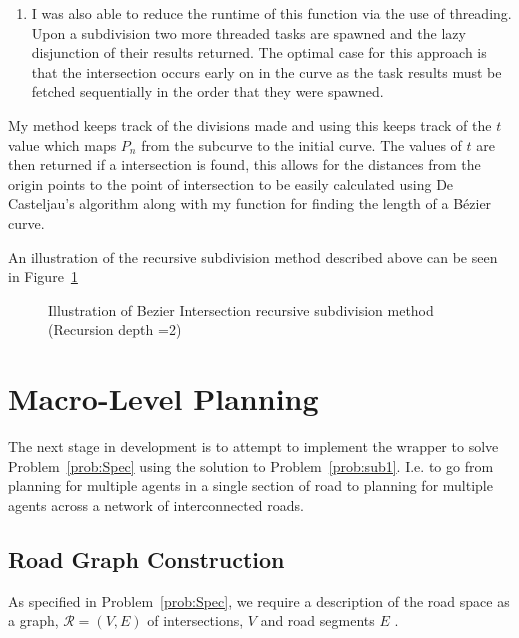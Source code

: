 \begin{enumerate}
  \item I was also able to reduce the runtime of this function via the use of threading. Upon a subdivision two more threaded tasks are spawned and the lazy disjunction of their results returned. The optimal case for this approach is that the intersection occurs early on in the curve as the task results must be fetched sequentially in the order that they were spawned. 

\end{enumerate}

My method keeps track of the divisions made and using this keeps track of the $t$ value which maps $P_{n}$ from the subcurve to the initial curve. The values of $t$ are then returned if a intersection is found, this allows for the distances from the origin points to the point of intersection to be easily calculated using De Casteljau's algorithm along with my function for finding the length of a Bézier curve.

An illustration of the recursive subdivision method described above can be seen in Figure~\ref{fig:bezIntIllustration}

\begin{figure}
\begin{turn}{90}

\end{turn}
\caption{\label{fig:bezIntIllustration} Illustration of Bezier Intersection recursive subdivision method (Recursion depth =2)}
\end{figure}

\section{Macro-Level Planning} 

The next stage in development is to attempt to implement the wrapper to solve Problem~\ref{prob:Spec} using the solution to Problem~\ref{prob:sub1}. I.e. to go from planning for multiple agents in a single section of road to planning for multiple agents across a network of interconnected roads.

\subsection{Road Graph Construction }

As specified in Problem~\ref{prob:Spec}, we require a description of the road space as a graph, $\mathcal{R}= (V,E)$ of intersections, $V$ and road segments $E$
.


